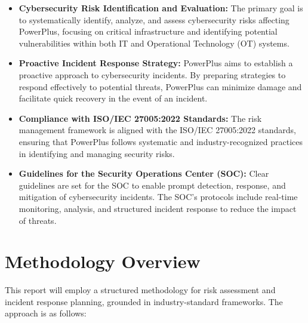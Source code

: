 \begin{itemize}
    \item \textbf{Cybersecurity Risk Identification and Evaluation:} The primary goal is to systematically identify, analyze, and assess cybersecurity risks affecting PowerPlus, focusing on critical infrastructure and identifying potential vulnerabilities within both IT and Operational Technology (OT) systems.
    \item \textbf{Proactive Incident Response Strategy:} PowerPlus aims to establish a proactive approach to cybersecurity incidents. By preparing strategies to respond effectively to potential threats, PowerPlus can minimize damage and facilitate quick recovery in the event of an incident.
    \item \textbf{Compliance with ISO/IEC 27005:2022 Standards:} The risk management framework is aligned with the ISO/IEC 27005:2022 standards, ensuring that PowerPlus follows systematic and industry-recognized practices in identifying and managing security risks.
    \item \textbf{Guidelines for the Security Operations Center (SOC):} Clear guidelines are set for the SOC to enable prompt detection, response, and mitigation of cybersecurity incidents. The SOC’s protocols include real-time monitoring, analysis, and structured incident response to reduce the impact of threats.
\end{itemize}

\section{Methodology Overview}


This report will employ a structured methodology for risk assessment and incident response planning, grounded in industry-standard frameworks. The approach is as follows:

